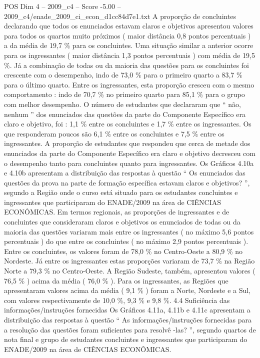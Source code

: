 \begin{textsample}{POS Dim 4 – 2009\_c4 – Score -5.00 – 2009\_c4/enade\_2009\_ci\_econ\_d1cc84d7e1.txt}
A proporção de concluintes declarando que todos os enunciados estavam claros e objetivos apresentou valores para todos os quartos muito próximos ( maior distância 0,8 pontos percentuais ) a da média de 19,7 \% para os concluintes.
Uma situação similar a anterior ocorre para os ingressantes ( maior distância 1,3 pontos percentuais ) com média de 19,5 \%.
Já a combinação de todas ou da maioria das questões para os concluintes foi crescente com o desempenho, indo de 73,0 \% para o primeiro quarto a 83,7 \% para o último quarto.
Entre os ingressantes, esta proporção cresceu com o mesmo comportamento : indo de 70,7 \% no primeiro quarto para 85,1 \% para o grupo com melhor desempenho.
O número de estudantes que declararam que “ não, nenhum ” dos enunciados das questões da parte do Componente Específico era claro e objetivo, foi : 1,1 \% entre os concluintes e 1,7 \% entre os ingressantes.
Os que responderam poucos são 6,1 \% entre os concluintes e 7,5 \% entre os ingressantes.
A proporção de estudantes que respondeu que cerca de metade dos enunciados da parte do Componente Específico era claro e objetivo decresceu com o desempenho tanto para concluintes quanto para ingressantes.
Os Gráficos 4.10a e 4.10b apresentam a distribuição das respostas à questão “ Os enunciados das questões da prova na parte de formação específica estavam claros e objetivos? ”, segundo a Região onde o curso está situado para os estudantes concluintes e ingressantes que participaram do ENADE/2009 na área de CIÊNCIAS ECONÔMICAS.
Em termos regionais, as proporções de ingressantes e de concluintes que consideraram claros e objetivos os enunciados de todas ou da maioria das questões variaram mais entre os ingressantes ( no máximo 5,6 pontos percentuais ) do que entre os concluintes ( no máximo 2,9 pontos percentuais ).
Entre os concluintes, os valores foram de 78,0 \% no Centro-Oeste a 80,9 \% no Nordeste.
Já entre os ingressantes estas proporções variaram de 73,7 \% na Região Norte a 79,3 \% no Centro-Oeste.
A Região Sudeste, também, apresentou valores ( 76,5 \% ) acima da média ( 76,0 \% ).
Para os ingressantes, as Regiões que apresentaram valores acima da média ( 9,1 \% ) foram a Norte, Nordeste e a Sul, com valores respectivamente de 10,0 \%, 9,3 \% e 9,8 \%. 4.4 Suficiência das informações/instruções fornecidas Os Gráficos 4.11a, 4.11b e 4.11c apresentam a distribuição das respostas à questão “ As informações/instruções fornecidas para a resolução das questões foram suficientes para resolvê -las? ”, segundo quartos de nota final e grupo de estudantes concluintes e ingressantes que participaram do ENADE/2009 na área de CIÊNCIAS ECONÔMICAS.

\end{textsample}
